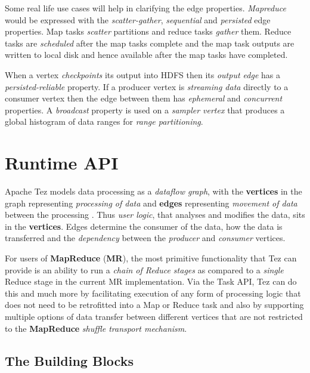 \documentclass[twocolumn]{article}
\begin{document}
Some real life use cases will help in clarifying the edge properties.
\emph{Mapreduce} would be expressed with the \emph{scatter-gather},
\emph{sequential} and \emph{persisted} edge properties. Map
tasks \emph{scatter} partitions and reduce tasks \emph{gather} them.
Reduce tasks are \emph{scheduled} after the map tasks complete
and the map task outputs are written to local disk and hence available
after the map tasks have completed. 

When a vertex \emph{checkpoints} its output into HDFS then its \emph{output edge} has a
\emph{persisted-reliable} property. If a producer vertex is
\emph{streaming data} directly to a consumer vertex then the edge
between them has \emph{ephemeral} and \emph{concurrent} properties. A
\emph{broadcast} property is used on a \emph{sampler vertex} that
produces a global histogram of data ranges for \emph{range
partitioning}.


\section{Runtime API}
Apache Tez models data processing as a \emph{dataflow graph}, with the
\textbf{vertices} in the graph representing \emph{processing of data}
and \textbf{edges} representing \emph{movement of data} between the
processing \cite{Saha:2013-03}. Thus \emph{user logic}, that analyses and modifies the data,
sits in the \textbf{vertices}. Edges determine the consumer of the data,
how the data is transferred and the \emph{dependency} between the
\emph{producer} and \emph{consumer} vertices.

For users of \textbf{MapReduce} (\textbf{MR}), the most primitive
functionality that Tez can provide is an ability to run a \emph{chain of
Reduce stages} as compared to a \emph{single} Reduce stage in the
current MR implementation. Via the Task API, Tez can do this and much
more by facilitating execution of any form of processing logic that does
not need to be retrofitted into a Map or Reduce task and also by
supporting multiple options of data transfer between different vertices
that are not restricted to the \textbf{MapReduce} \emph{shuffle
transport mechanism}.

\subsection{The Building Blocks}
\end{document}
